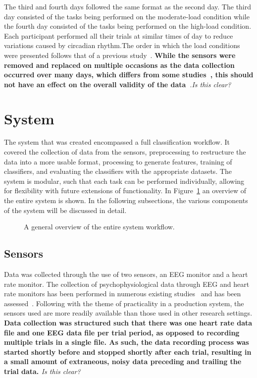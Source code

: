 \documentclass[11pt]{article}
\begin{document}
	The third and fourth days followed the same format as the second day. The third day consisted of the tasks being performed on the moderate-load condition while the fourth day consisted of the tasks being performed on the high-load condition. Each participant performed all their trials at similar times of day to reduce variations caused by circadian rhythm.The order in which the load conditions were presented follows that of a previous study~\cite{Wilson}. {\bf While the sensors were removed and replaced on multiple occasions as the data collection occurred over many days, which differs from some studies~\cite{Wilson, Ke, Zhang}, this should not have an effect on the overall validity of the data~\cite{Estepp_2015}}.\emph{Is this clear?}


\section{System}
The system that was created encompassed a full classification workflow. It covered the collection of data from the sensors, preprocessing to restructure the data into a more usable format, processing to generate features, training of classifiers, and evaluating the classifiers with the appropriate datasets. The system is modular, such that each task can be performed individually, allowing for flexibility with future extensions of functionality. 
In Figure~\ref{fig:system-overview} an overview of the entire system is shown. In the following subsections, the various components of the system will be discussed in detail. 
\begin{figure}
\centering
{}
\caption[General Overview of Complete System Workflow]{A general overview of the entire system workflow.}
\label{fig:system-overview}
\end{figure} 

	\subsection{Sensors}
	Data was collected through the use of two sensors, an EEG monitor and a heart rate monitor. The collection of psychophysiological data through EEG and heart rate monitors has been performed in numerous existing studies~\cite{Wilson, Yang, Wang_Z} and has been assessed~\cite{Sweller}. Following with the theme of practicality in a production system, the sensors used are more readily available than those used in other research settings. {\bf Data collection was structured such that there was one heart rate data file and one EEG data file per trial period, as opposed to recording multiple trials in a single file. As such, the data recording process was started shortly before and stopped shortly after each trial, resulting in a small amount of extraneous, noisy data preceding and trailing the trial data. \bf}\emph{Is this clear?}
		
\end{document}
